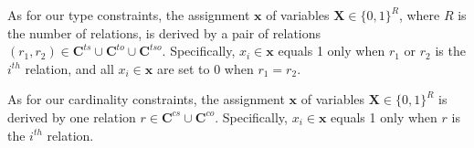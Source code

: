 As for our type constraints, the assignment $\bm x$ of variables $\bm{X}\in \{0,1\}^{R}$, where $R$ is the number of relations, 
is derived by a pair of relations $(r_1, r_2) \in \bm{C}^{ts} \cup \bm{C}^{to} \cup \bm{C}^{tso}$. 
Specifically, $x_i\in \bm{x}$ equals 1 only when $r_1$ or $r_2$ is the $i^{th}$ relation,
and all $x_i\in \bm{x}$ are set to 0 when $r_1=r_2$.

As for our cardinality constraints, the assignment $\bm x$ of variables $\bm{X}\in \{0,1\}^{R}$ is derived by one relation $r \in \bm{C}^{cs} \cup \bm{C}^{co}$. 
Specifically, $x_i\in \bm{x}$ equals 1 only when $r$ is the $i^{th}$ relation.

\iffalse



